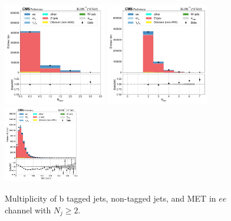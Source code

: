 \begin{figure}[htb!]
    \centering
    \includegraphics[width=0.4\textwidth]{chapters/Appendix/sectionPlots/figures/data_mc_overlays/ee_2016_inclusive_linear_jet_n_bjets}
    \includegraphics[width=0.4\textwidth]{chapters/Appendix/sectionPlots/figures/data_mc_overlays/ee_2016_inclusive_linear_jet_n_jets}
    \includegraphics[width=0.3\textwidth]{chapters/Appendix/sectionPlots/figures/data_mc_overlays/ee_2016_inclusive_linear_misc_met_mag}
    \caption{Multiplicity of b tagged jets, non-tagged jets, and MET in
    $ee$ channel with $N_{j} \geq 2$.}
    \label{fig:ee_jetmet}
\end{figure}

